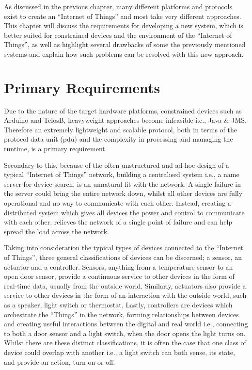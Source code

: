  

As discussed in the previous chapter, many different platforms and protocols exist to create an ``Internet of Things'' and most take very different approaches. This chapter will discuss the requirements for developing a new system, which is better suited for constrained devices and the environment of the ``Internet of Things'', as well as highlight several drawbacks of some the previously mentioned systems and explain how such problems can be resolved with this new approach.

\section{Primary Requirements}
\label{sec:primary_requirements}
Due to the nature of the target hardware platforms, constrained devices such as Arduino and TelosB, heavyweight approaches become infeasible i.e., Java \& JMS. Therefore an extremely lightweight and scalable protocol, both in terms of the protocol data unit (pdu) and the complexity in processing and managing the runtime, is a primary requirement.

Secondary to this, because of the often unstructured and ad-hoc design of a typical ``Internet of Things'' network, building a centralised system i.e., a name server for device search, is an unnatural fit with the network. A single failure in the server could bring the entire network down, whilst all other devices are fully operational and no way to communicate with each other.
Instead, creating a distributed system which gives all devices the power and control to communicate with each other, relieves the network of a single point of failure and can help spread the load across the network. %

Taking into consideration the typical types of devices connected to the ``Internet of Things'', three general classifications of devices can be discerned; a sensor, an actuator and a controller. Sensors, anything from a temperature sensor to an open door sensor, provide a continuous service to other devices in the form of real-time data, usually from the outside world. Similarly, actuators also provide a service to other devices in the form of an interaction with the outside world, such as a speaker, light switch or thermostat. Lastly, controllers are devices which orchestrate the ``Things'' in the network, forming relationships between devices and creating useful interactions between the digital and real world i.e., connecting to both a door sensor and a light switch, when the door opens the light turns on. Whilst there are these distinct classifications, it is often the case that one class of device could overlap with another i.e., a light switch can both sense, its state, and provide an action, turn on or off.


